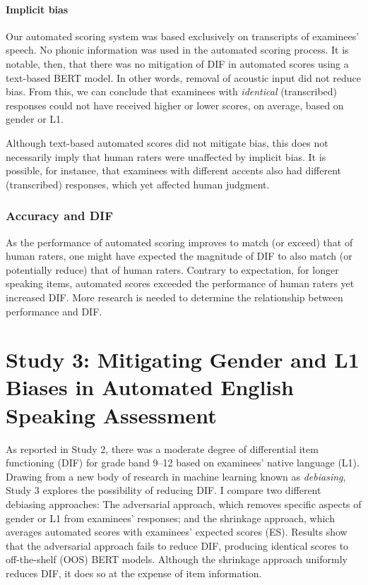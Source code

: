 \documentclass [PhD] {uclathes}
\begin{document}
\subsubsection{Implicit bias}

Our automated scoring system was based exclusively on transcripts of examinees’ speech. No phonic information was used in the automated scoring process. It is notable, then, that there was no mitigation of DIF in automated scores using a text-based BERT model. In other words, removal of acoustic input did not reduce bias. From this, we can conclude that examinees with \emph{identical} (transcribed) responses could not have received higher or lower scores, on average, based on gender or L1. 

Although text-based automated scores did not mitigate bias, this does not necessarily imply that human raters were unaffected by implicit bias. It is possible, for instance, that examinees with different accents also had different (transcribed) responses, which yet affected human judgment. 

\subsection{Accuracy and DIF}

As the performance of automated scoring improves to match (or exceed) that of human raters, one might have expected the magnitude of DIF to also match (or potentially reduce) that of human raters. Contrary to expectation, for longer speaking items, automated scores exceeded the performance of human raters yet increased DIF. More research is needed to determine the relationship between performance and DIF. 



\chapter{Study 3: Mitigating Gender and L1 Biases in Automated English Speaking Assessment}
\label{study3}

As reported in Study 2, there was a moderate degree of differential item functioning (DIF) for grade band 9–12 based on examinees’ native language (L1). Drawing from a new body of research in machine learning known as \emph{debiasing}, Study 3 explores the possibility of reducing DIF. I compare two different debiasing approaches: The adversarial approach, which removes specific aspects of gender or L1 from examinees’ responses; and the shrinkage approach, which averages automated scores with examinees’ expected scores (ES). Results show that the adversarial approach fails to reduce DIF, producing identical scores to off-the-shelf (OOS) BERT models. Although the shrinkage approach uniformly reduces DIF, it does so at the expense of item information. 
\end{document}
